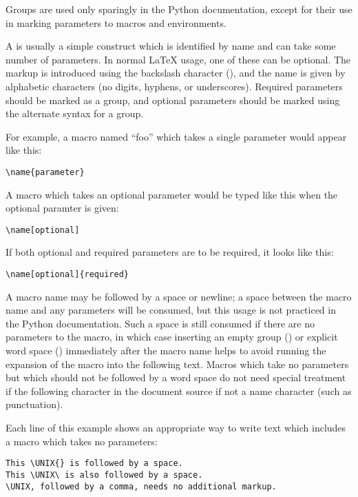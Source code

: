 \documentclass{howto}
\begin{document}
    Groups are used only sparingly in the Python documentation, except
    for their use in marking parameters to macros and environments.

    A  is usually a simple construct which is identified by
    name and can take some number of parameters.  In normal \LaTeX{}
    usage, one of these can be optional.  The markup is introduced
    using the backslash character (\character{\e}), and the name is
    given by alphabetic characters (no digits, hyphens, or
    underscores).  Required parameters should be marked as a group,
    and optional parameters should be marked using the alternate
    syntax for a group.

    For example, a macro named ``foo'' which takes a single parameter
    would appear like this:

\begin{verbatim}
\name{parameter}
\end{verbatim}

    A macro which takes an optional parameter would be typed like this
    when the optional paramter is given:

\begin{verbatim}
\name[optional]
\end{verbatim}

    If both optional and required parameters are to be required, it
    looks like this:

\begin{verbatim}
\name[optional]{required}
\end{verbatim}

    A macro name may be followed by a space or newline; a space
    between the macro name and any parameters will be consumed, but
    this usage is not practiced in the Python documentation.  Such a
    space is still consumed if there are no parameters to the macro,
    in which case inserting an empty group (\code{\{\}}) or explicit
    word space (\samp{\e\ }) immediately after the macro name helps to
    avoid running the expansion of the macro into the following text.
    Macros which take no parameters but which should not be followed
    by a word space do not need special treatment if the following
    character in the document source if not a name character (such as
    punctuation).

    Each line of this example shows an appropriate way to write text
    which includes a macro which takes no parameters:

\begin{verbatim}
This \UNIX{} is followed by a space.
This \UNIX\ is also followed by a space.
\UNIX, followed by a comma, needs no additional markup.
\end{verbatim}
\end{document}
